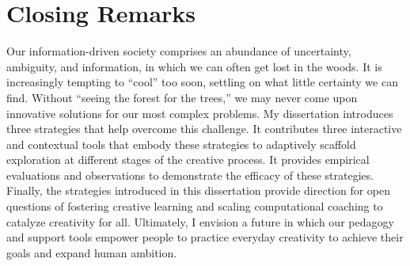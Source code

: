 \section{Closing Remarks}
Our information-driven society comprises an abundance of uncertainty, ambiguity, and information, in which we can often get lost in the woods. It is increasingly tempting to “cool” too soon, settling on
what little certainty we can find. Without “seeing the forest for the trees,” we may never come upon innovative solutions for our most complex problems. My dissertation introduces three strategies that help overcome this challenge. It contributes three interactive and contextual tools that embody these strategies to adaptively scaffold exploration at different stages of the creative process. It provides empirical evaluations and observations to demonstrate the efficacy of these strategies. Finally, the strategies introduced in this dissertation provide direction for open questions of fostering creative learning and scaling computational coaching to catalyze creativity for all. 
Ultimately, I envision a future in which our pedagogy and support tools empower people to practice everyday creativity to achieve their goals and expand human ambition.

